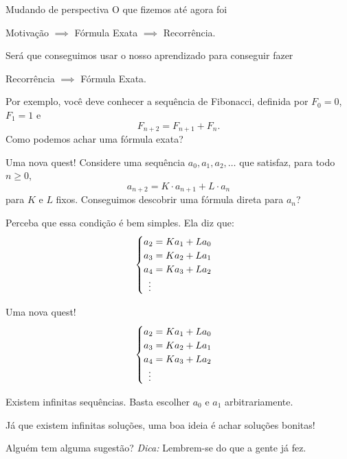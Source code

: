\documentclass[aspectratio=169, handout]{beamer}
\begin{document}
\begin{frame}{Mudando de perspectiva}
	O que fizemos até agora foi
	\begin{center}
		Motivação $\implies$ Fórmula Exata $\implies$ Recorrência.
	\end{center}

	\pause Será que conseguimos usar o nosso aprendizado para conseguir fazer
	\begin{center}
		Recorrência $\implies$ Fórmula Exata.
	\end{center}

	\pause Por exemplo, você deve conhecer a sequência de Fibonacci, definida por $F_0 = 0$, $F_1 = 1$ e  \[
		F_{n+2} = F_{n+1} + F_n.
	\]
	Como podemos achar uma fórmula exata?
\end{frame}

\begin{frame}{Uma nova quest!}
	Considere uma sequência $a_0, a_1, a_2, \dots$ que satisfaz, para todo $n \ge 0$,  \[
		a_{n+2} = K \cdot a_{n+1} + L \cdot a_n
	\]
	para $K$ e $L$ fixos. \pause Conseguimos descobrir uma fórmula direta para $a_n$?

	\pause Perceba que essa condição é bem simples. Ela diz que: \pause
	\[
		\begin{cases}
			a_2 = K a_1 + L a_0 \\
			a_3 = K a_2 + L a_1 \\
			a_4 = K a_3 + L a_2 \\
			\hspace{.5em} \vdots
		\end{cases}
	\]

\end{frame}

\begin{frame}{Uma nova quest!}
	\[
		\begin{cases}
			a_2 = K a_1 + L a_0 \\
			a_3 = K a_2 + L a_1 \\
			a_4 = K a_3 + L a_2 \\
			\hspace{.5em} \vdots
		\end{cases}
	\]
	
	Existem infinitas sequências. \pause Basta escolher $a_0$ e $a_1$ arbitrariamente.

	\vspace{1em}

	\pause Já que existem infinitas soluções, uma boa ideia é achar soluções bonitas!

	\vspace{1em}

	\pause Alguém tem alguma sugestão? \pause \emph{Dica:} Lembrem-se do que a gente já fez.
\end{frame}
\end{document}
